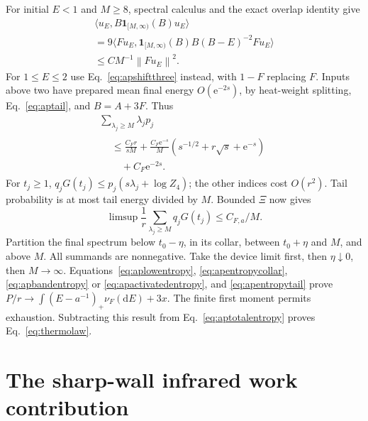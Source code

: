 \documentclass[aps,pra,reprint,superscriptaddress,longbibliography]{revtex4-2}
\newcommand{\dd}{\mathrm d}
\newcommand{\ee}{\mathrm e}
\newcommand{\norm}[1]{\left\lVert#1\right\rVert}
\newcommand{\ip}[2]{\langle#1,#2\rangle}
\newcommand{\one}{\mathbf 1}
\begin{document}
For initial $E<1$ and $M\ge8$, spectral calculus and the exact
overlap identity give
\begin{equation}
 \begin{gathered}
 \ip{u_E}{B\one_{[M,\infty)}(B)u_E}\\
 =9\ip{Fu_E}{\one_{[M,\infty)}(B)B(B-E)^{-2}Fu_E}\\
 \le CM^{-1}\norm{Fu_E}^2.
 \end{gathered}                                         \label{eq:apenergytail}
\end{equation}
For $1\le E\le2$ use Eq.~\eqref{eq:apshiftthree} instead, with
$1-F$ replacing $F$. Inputs above two have prepared mean final
energy $O(\ee^{-2s})$, by heat-weight splitting,
Eq.~\eqref{eq:aptail}, and $B=A+3F$. Thus
\begin{equation}
 \begin{gathered}
 \sum_{\lambda_j\ge M}\lambda_jp_j\\
 \begin{aligned}
 &\le\frac{C_Fr}{sM}
 +\frac{C_F\ee^{-s}}M(s^{-1/2}+r\sqrt s+\ee^{-s})\\
 &\quad+C_F\ee^{-2s}.
 \end{aligned}
 \end{gathered}                                         \label{eq:apfullenergytail}
\end{equation}
For $t_j\ge1$, $q_jG(t_j)\le p_j(s\lambda_j+\log Z_4)$;
the other indices cost $O(r^2)$. Tail probability is at most tail
energy divided by $M$. Bounded $\Xi$ now gives
\begin{equation}
 \limsup\frac1r\sum_{\lambda_j\ge M}q_jG(t_j)
                                      \le C_{F,a}/M.     \label{eq:apentropytail}
\end{equation}
Partition the final spectrum below $t_0-\eta$, in its collar,
between $t_0+\eta$ and $M$, and above $M$. All summands are
nonnegative. Take the device limit first, then $\eta\downarrow0$,
then $M\to\infty$. Equations~\eqref{eq:aplowentropy},
\eqref{eq:apentropycollar}, \eqref{eq:apbandentropy} or
\eqref{eq:apactivatedentropy}, and \eqref{eq:apentropytail} prove
$P/r\to\int(E-a^{-1})_+\nu_F(\dd E)+3x$. The finite first moment
permits exhaustion. Subtracting this result from
Eq.~\eqref{eq:aptotalentropy} proves Eq.~\eqref{eq:thermolaw}.

\section{The sharp-wall infrared work contribution}
\label{app:infrared}
\end{document}
